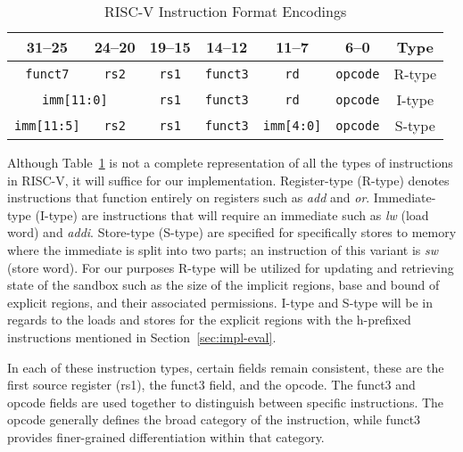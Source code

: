 \documentclass[conference,compsoc]{IEEEtran}
\begin{document}
\begin{table}[H]
  \centering
  \caption{RISC-V Instruction Format Encodings}
  {\fontsize{6.5}{7.5}\selectfont
  \begin{tabular}{|c|c|c|c|c|c|c|}
  \hline
  \textbf{31--25} & \textbf{24--20} & \textbf{19--15} & \textbf{14--12} & \textbf{11--7} & \textbf{6--0} & \textbf{Type} \\
  \hline
  \texttt{funct7} & \texttt{rs2} & \texttt{rs1} & \texttt{funct3} & \texttt{rd} & \texttt{opcode} & R-type \\
  \hline
  \multicolumn{2}{|c|}{\texttt{imm[11:0]}} & \texttt{rs1} & \texttt{funct3} & \texttt{rd} & \texttt{opcode} & I-type \\
  \hline
  \texttt{imm[11:5]} & \texttt{rs2} & \texttt{rs1} & \texttt{funct3} & \texttt{imm[4:0]} & \texttt{opcode} & S-type \\
  \hline
  \end{tabular} 
  }
  \label{tab:encoding-summary}
\end{table}

Although Table~\ref{tab:encoding-summary} is not a complete representation of all the types of instructions in RISC-V, it will suffice for our implementation.
Register-type (R-type) denotes instructions that function entirely on registers such as \textit{add} and \textit{or}.
Immediate-type (I-type) are instructions that will require an immediate such as \textit{lw} (load word) and \textit{addi}.
Store-type (S-type) are specified for specifically stores to memory where the immediate is split into two parts; an instruction of this variant is \textit{sw} (store word).
For our purposes R-type will be utilized for updating and retrieving state of the sandbox such as the size of the implicit regions, base and bound of explicit regions, and their associated permissions.
I-type and S-type will be in regards to the loads and stores for the explicit regions with the h-prefixed instructions mentioned in Section~\ref{sec:impl-eval}.

In each of these instruction types, certain fields remain consistent, these are the first source register (rs1), the funct3 field, and the opcode. 
The funct3 and opcode fields are used together to distinguish between specific instructions. 
The opcode generally defines the broad category of the instruction, while funct3 provides finer-grained differentiation within that category.
\end{document}
